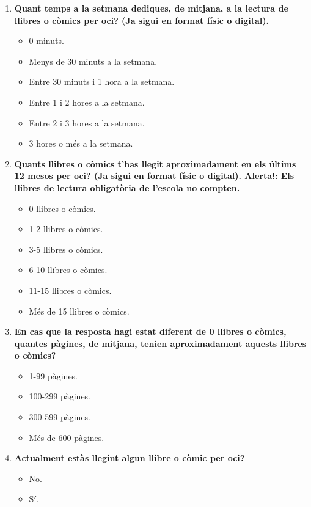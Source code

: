 \documentclass[12pt]{article}
\begin{document}
\begin{enumerate}
    \item \textbf{Quant temps a la setmana dediques, de mitjana, a la lectura de llibres o còmics per oci? (Ja sigui en format físic o digital).}
    \begin{itemize}
        \item[$\square$] 0 minuts.
        \item[$\square$] Menys de 30 minuts a la setmana.
        \item[$\square$] Entre 30 minuts i 1 hora a la setmana.
        \item[$\square$] Entre 1 i 2 hores a la setmana.
        \item[$\square$] Entre 2 i 3 hores a la setmana.
        \item[$\square$] 3 hores o més a la setmana.
    \end{itemize}

    \item \textbf{Quants llibres o còmics t'has llegit aproximadament en els últims 12 mesos per oci? (Ja sigui en format físic o digital). Alerta!: Els llibres de lectura obligatòria de l'escola no compten.}
    \begin{itemize}
        \item[$\square$] 0 llibres o còmics.
        \item[$\square$] 1-2 llibres o còmics.
        \item[$\square$] 3-5 llibres o còmics.
        \item[$\square$] 6-10 llibres o còmics.
        \item[$\square$] 11-15 llibres o còmics.
        \item[$\square$] Més de 15 llibres o còmics.
    \end{itemize}

    \item \textbf{En cas que la resposta hagi estat diferent de 0 llibres o còmics, quantes pàgines, de mitjana, tenien aproximadament aquests llibres o còmics?}
    \begin{itemize}
        \item[$\square$] 1-99 pàgines.
        \item[$\square$] 100-299 pàgines.
        \item[$\square$] 300-599 pàgines.
        \item[$\square$] Més de 600 pàgines.
    \end{itemize}

    \item \textbf{Actualment estàs llegint algun llibre o còmic per oci?}
    \begin{itemize}
        \item[$\square$] No.
        \item[$\square$] Sí.
    \end{itemize}


\end{enumerate}
\end{document}
